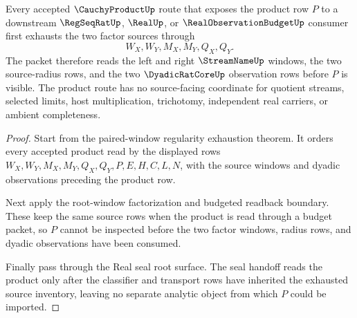\begin{theorem}
\label{thm:cauchy-product-root-factor-source-exhaustion}
Every accepted $\CauchyProductUp$ route that exposes the product row $P$ to a downstream $\RegSeqRatUp$, $\RealUp$, or $\RealObservationBudgetUp$ consumer first exhausts the two factor sources through
$$
W_X,W_Y,M_X,M_Y,Q_X,Q_Y.
$$
The packet therefore reads the left and right $\StreamNameUp$ windows, the two source-radius rows, and the two $\DyadicRatCoreUp$ observation rows before $P$ is visible. The product route has no source-facing coordinate for quotient streams, selected limits, host multiplication, trichotomy, independent real carriers, or ambient completeness.
\end{theorem}
\begin{proof}
Start from the paired-window regularity exhaustion theorem. It orders every accepted product read by the displayed rows $W_X,W_Y,M_X,M_Y,Q_X,Q_Y,P,E,H,C,L,N$, with the source windows and dyadic observations preceding the product row.

Next apply the root-window factorization and budgeted readback boundary. These keep the same source rows when the product is read through a budget packet, so $P$ cannot be inspected before the two factor windows, radius rows, and dyadic observations have been consumed.

Finally pass through the Real seal root surface. The seal handoff reads the product only after the classifier and transport rows have inherited the exhausted source inventory, leaving no separate analytic object from which $P$ could be imported.
\end{proof}


